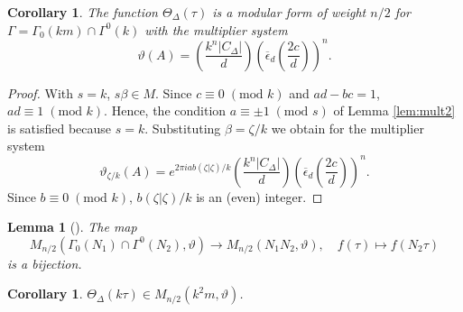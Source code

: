 \documentclass[11pt,a4paper]{amsart}
\newtheorem{lemma}[theorem]{Lemma}
\newtheorem{corollary}[theorem]{Corollary}
\theoremstyle{definition}
\newcommand{\SZ}{\mathbb{Z}}                    %
\begin{document}
\begin{corollary}
	\label{cor:thetazetamult} 
	The function $\Theta_{\Delta}(\tau)$ is a modular form of weight $n/2$ for $\Gamma=\Gamma_0(km)\cap \Gamma^0(k)$ with the multiplier system
	\[ \vartheta(A)=\left(\frac{k^n|C_{\Delta}|}{d}\right)\left(\overline{\epsilon}_d \left(\frac{2c}{d}\right)\right)^n. \]
	
	
\end{corollary}
\begin{proof}
	With $s=k$, $s\beta \in M$. %
	Since $c \equiv 0 \; (\textrm{mod } k)$ and $ad-bc=1$, $ad \equiv 1 \; (\textrm{mod } k)$. Hence, the condition 
	$a \equiv \pm 1 \; (\textrm{mod } s)$ of  Lemma \ref{lem:mult2} is satisfied because $s=k$. 
	Substituting $\beta=\zeta/k$ we obtain for the multiplier system
	\[ \vartheta_{\zeta/k}(A)=e^{2 \pi i  a b (\zeta|\zeta)/k }\left(\frac{k^n|C_{\Delta}|}{d}\right)\left(\overline{\epsilon}_d \left(\frac{2c}{d}\right)\right)^n. \]
	Since  $b \equiv 0 \; (\textrm{mod } k)$, $b (\zeta|\zeta)/k$ is an (even) integer.
	
\end{proof}
\begin{lemma}[{\cite[Remark after Theorem 3]{gordon1993multiplicative}}]
	The map 
	\[ M_{n/2}(\Gamma_0(N_1) \cap \Gamma^0(N_2), \vartheta) \to M_{n/2}(N_1N_2, \vartheta), \quad f(\tau) \mapsto f(N_2 \tau)\]
	is a bijection.
\end{lemma}

\begin{corollary} $\Theta_{\Delta}(k\tau) \in M_{n/2}(k^2m, \vartheta)$.
\end{corollary}
\end{document}
